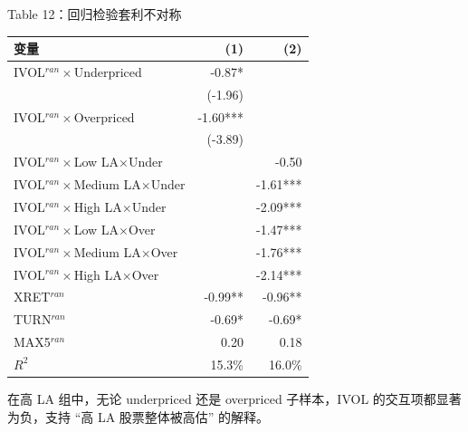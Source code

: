 \documentclass[aspectratio=169,10pt]{beamer}
\newcommand{\tinytab}{\tiny\setlength{\tabcolsep}{2.2pt}\renewcommand{\arraystretch}{1.08}}
\begin{document}
\begin{frame}{Table 12：回归检验套利不对称}
	\tinytab
	\begin{tabular}{lrr}
		\toprule
		变量 & (1) & (2)\\
		\midrule
		IVOL$^{ran}\times$Underpriced & -0.87* & \\
		& (-1.96) & \\
		IVOL$^{ran}\times$Overpriced & -1.60*** & \\
		& (-3.89) & \\
		IVOL$^{ran}\times$Low LA$\times$Under & & -0.50\\
		IVOL$^{ran}\times$Medium LA$\times$Under & & -1.61***\\
		IVOL$^{ran}\times$High LA$\times$Under & & -2.09***\\
		IVOL$^{ran}\times$Low LA$\times$Over & & -1.47***\\
		IVOL$^{ran}\times$Medium LA$\times$Over & & -1.76***\\
		IVOL$^{ran}\times$High LA$\times$Over & & -2.14***\\
		XRET$^{ran}$ & -0.99** & -0.96**\\
		TURN$^{ran}$ & -0.69* & -0.69*\\
		MAX5$^{ran}$ & 0.20 & 0.18\\
		$R^2$ & 15.3\% & 16.0\%\\
		\bottomrule
	\end{tabular}
	\par\vspace{5pt}
	\small 在高 LA 组中，无论 underpriced 还是 overpriced 子样本，IVOL 的交互项都显著为负，支持 ``高 LA 股票整体被高估'' 的解释。
\end{frame}
\end{document}
